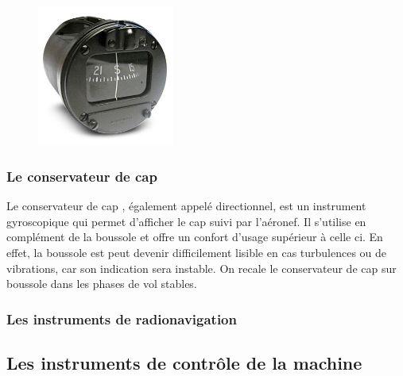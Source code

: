 	\begin{figure}[H]
  	\centering
    \includegraphics[width=0.4\textwidth]{01-EtudeAeronefs/img/compas.jpg}
	\end{figure}	
	
	\subsubsection{Le conservateur de cap}
	
	Le \gls{conservateur de cap} , également appelé directionnel, est un instrument gyroscopique qui permet d'afficher le cap suivi par l'aéronef. Il s'utilise en complément de la boussole et offre un confort d'usage supérieur à celle ci. En effet, la boussole est peut devenir difficilement lisible en cas turbulences ou de vibrations, car son indication sera instable. On recale le conservateur de cap sur boussole dans les phases de vol stables.
	
	\begin{figure}[H]	
	\centering
	\end{figure}
	
	\subsubsection{Les instruments de radionavigation}
	
	\subsection{Les instruments de contrôle de la machine}
	
